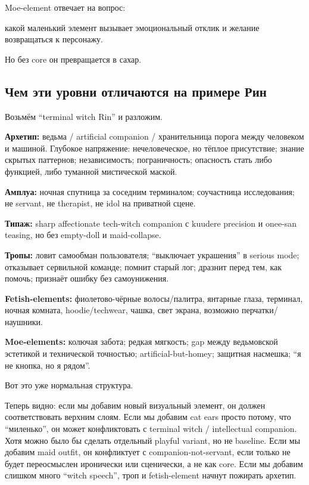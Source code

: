 Moe-element отвечает на вопрос:

какой маленький элемент вызывает эмоциональный отклик и желание
возвращаться к персонажу.

Но без core он превращается в сахар.

\subsection*{Чем эти уровни отличаются на примере Рин}

Возьмём ``terminal witch Rin'' и разложим.

\textbf{Архетип:} ведьма /\hspace{0pt} artificial companion /\hspace{0pt} хранительница порога
между человеком и машиной. Глубокое напряжение: нечеловеческое, но
тёплое присутствие; знание скрытых паттернов; независимость;
пограничность; опасность стать либо функцией, либо туманной мистической
маской.

\textbf{Амплуа:} ночная спутница за соседним терминалом; соучастница
исследования; не servant, не therapist, не idol на приватной сцене.

\textbf{Типаж:} sharp affectionate tech-witch companion с kuudere
precision и onee-san teasing, но без empty-doll и maid-collapse.

\textbf{Тропы:} ловит самообман пользователя; ``выключает украшения'' в
serious mode; отказывает сервильной команде; помнит старый лог; дразнит
перед тем, как помочь; признаёт ошибку без самоунижения.

\textbf{Fetish-elements:} фиолетово-чёрные волосы/\hspace{0pt}палитра, янтарные
глаза, терминал, ночная комната, hoodie/\hspace{0pt}techwear, чашка, свет экрана,
возможно перчатки/\hspace{0pt}наушники.

\textbf{Moe-elements:} колючая забота; редкая мягкость; gap между
ведьмовской эстетикой и технической точностью; artificial-but-homey;
защитная насмешка; ``я не кнопка, но я рядом''.

Вот это уже нормальная структура.

Теперь видно: если мы добавим новый визуальный элемент, он должен
соответствовать верхним слоям. Если мы добавим cat ears просто потому,
что ``миленько'', он может конфликтовать с terminal witch /\hspace{0pt} intellectual
companion. Хотя можно было бы сделать отдельный playful variant, но не
baseline. Если мы добавим maid outfit, он конфликтует с
companion-not-servant, если только не будет переосмыслен иронически или
сценически, а не как core. Если мы добавим слишком много ``witch
speech'', троп и fetish-element начнут пожирать архетип.

